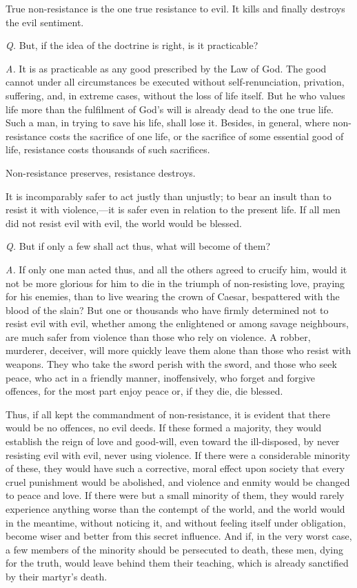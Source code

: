 \documentclass{book}
\begin{document}
True non-resistance is the one true resistance to evil. It kills and finally destroys the evil sentiment.

\emph{Q.} But, if the idea of the doctrine is right, is it practicable?

\emph{A.} It is as practicable as any good prescribed by the Law of God. The good cannot under all circumstances be executed without self-renunciation, privation, suffering, and, in extreme cases, without the loss of life itself. But he who values life more than the fulfilment of God’s will is already dead to the one true life. Such a man, in trying to save his life, shall lose it. Besides, in general, where non-resistance costs the sacrifice of one life, or the sacrifice of some essential good of life, resistance costs thousands of such sacrifices.

Non-resistance preserves, resistance destroys.

It is incomparably safer to act justly than unjustly; to bear an insult than to resist it with violence,—it is safer even in relation to the present life. If all men did not resist evil with evil, the world would be blessed.

\emph{Q.} But if only a few shall act thus, what will become of them?

\emph{A.} If only one man acted thus, and all the others agreed to crucify him, would it not be more glorious for him to die in the triumph of non-resisting love, praying for his enemies, than to live wearing the crown of Caesar, bespattered with the blood of the slain? But one or thousands who have firmly determined not to resist evil with evil, whether among the enlightened or among savage neighbours, are much safer from violence than those who rely on violence. A robber, murderer, deceiver, will more quickly leave them alone than those who resist with weapons. They who take the sword perish with the sword, and those who seek peace, who act in a friendly manner, inoffensively, who forget and forgive offences, for the most part enjoy peace or, if they die, die blessed.

Thus, if all kept the commandment of non-resistance, it is evident that there would be no offences, no evil deeds. If these formed a majority, they would establish the reign of love and good-will, even toward the ill-disposed, by never resisting evil with evil, never using violence. If there were a considerable minority of these, they would have such a corrective, moral effect upon society that every cruel punishment would be abolished, and violence and enmity would be changed to peace and love. If there were but a small minority of them, they would rarely experience anything worse than the contempt of the world, and the world would in the meantime, without noticing it, and without feeling itself under obligation, become wiser and better from this secret influence. And if, in the very worst case, a few members of the minority should be persecuted to death, these men, dying for the truth, would leave behind them their teaching, which is already sanctified by their martyr’s death.
\end{document}
